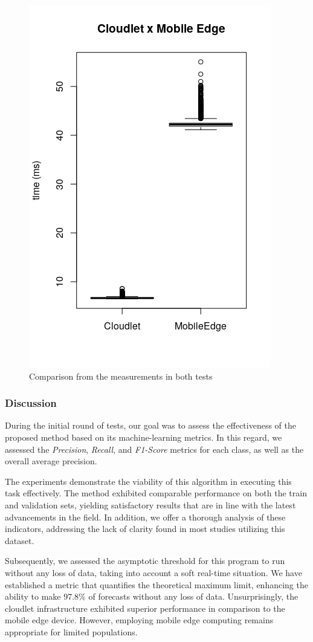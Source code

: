 \begin{figure}[h!]
    \centering
    \includegraphics[width=.4\linewidth]{Figures/time-compare.png}
    \caption{Comparison from the measurements in both tests}
    \label{fig:compare-times}
\end{figure}

\subsubsection{Discussion}

During the initial round of tests, our goal was to assess the effectiveness of the proposed method based on its machine-learning metrics. In this regard, we assessed the \textit{Precision}, \textit{Recall}, and \textit{F1-Score} metrics for each class, as well as the overall average precision. 

The experiments demonstrate the viability of this algorithm in executing this task effectively. The method exhibited comparable performance on both the train and validation sets, yielding satisfactory results that are in line with the latest advancements in the field. In addition, we offer a thorough analysis of these indicators, addressing the lack of clarity found in most studies utilizing this dataset.

Subsequently, we assessed the asymptotic threshold for this program to run without any loss of data, taking into account a soft real-time situation. We have established a metric that quantifies the theoretical maximum limit, enhancing the ability to make 97.8\% of forecasts without any loss of data. Unsurprisingly, the cloudlet infrastructure exhibited superior performance in comparison to the mobile edge device. However, employing mobile edge computing remains appropriate for limited populations.

\cleardoublepage
